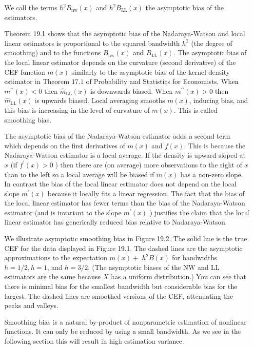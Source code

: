 \documentclass[10pt]{article}
\begin{document}
We call the terms $h^{2} B_{\mathrm{nw}}(x)$ and $h^{2} B_{\mathrm{LL}}(x)$ the asymptotic bias of the estimators.

Theorem 19.1 shows that the asymptotic bias of the Nadaraya-Watson and local linear estimators is proportional to the squared bandwidth $h^{2}$ (the degree of smoothing) and to the functions $B_{\mathrm{nw}}(x)$ and $B_{\mathrm{LL}}(x)$. The asymptotic bias of the local linear estimator depends on the curvature (second derivative) of the CEF function $m(x)$ similarly to the asymptotic bias of the kernel density estimator in Theorem $17.1$ of Probability and Statistics for Economists. When $m^{\prime \prime}(x)<0$ then $\hat{m}_{\mathrm{LL}}(x)$ is downwards biased. When $m^{\prime \prime}(x)>0$ then $\widehat{m}_{\mathrm{LL}}(x)$ is upwards biased. Local averaging smooths $m(x)$, inducing bias, and this bias is increasing in the level of curvature of $m(x)$. This is called smoothing bias.

The asymptotic bias of the Nadaraya-Watson estimator adds a second term which depends on the first derivatives of $m(x)$ and $f(x)$. This is because the Nadaraya-Watson estimator is a local average. If the density is upward sloped at $x$ (if $f^{\prime}(x)>0$ ) then there are (on average) more observations to the right of $x$ than to the left so a local average will be biased if $m(x)$ has a non-zero slope. In contrast the bias of the local linear estimator does not depend on the local slope $m^{\prime}(x)$ because it locally fits a linear regression. The fact that the bias of the local linear estimator has fewer terms than the bias of the Nadaraya-Watson estimator (and is invariant to the slope $m^{\prime}(x)$ ) justifies the claim that the local linear estimator has generically reduced bias relative to Nadaraya-Watson.

We illustrate asymptotic smoothing bias in Figure 19.2. The solid line is the true CEF for the data displayed in Figure 19.1. The dashed lines are the asymptotic approximations to the expectation $m(x)+$ $h^{2} B(x)$ for bandwidths $h=1 / 2, h=1$, and $h=3 / 2$. (The asymptotic biases of the NW and LL estimators are the same because $X$ has a uniform distribution.) You can see that there is minimal bias for the smallest bandwidth but considerable bias for the largest. The dashed lines are smoothed versions of the CEF, attenuating the peaks and valleys.

Smoothing bias is a natural by-product of nonparametric estimation of nonlinear functions. It can only be reduced by using a small bandwidth. As we see in the following section this will result in high estimation variance.
\end{document}
